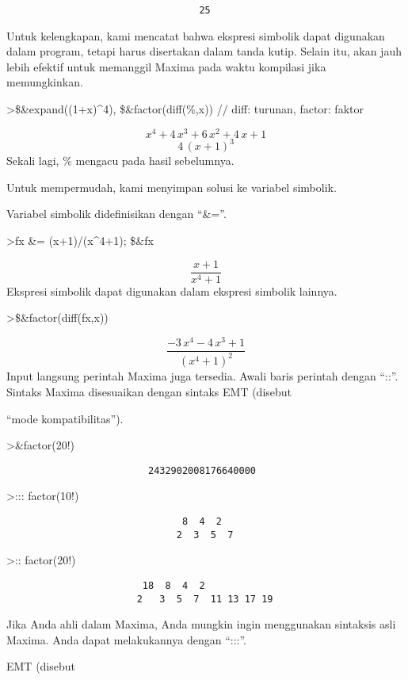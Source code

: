 \documentclass[
]{book}
\begin{document}
\begin{verbatim}
                                  25
\end{verbatim}

Untuk kelengkapan, kami mencatat bahwa ekspresi simbolik dapat digunakan dalam program, tetapi harus disertakan dalam tanda kutip. Selain itu, akan jauh lebih efektif untuk memanggil Maxima pada waktu kompilasi jika memungkinkan.

\textgreater\$\&expand((1+x)\^{}4), \$\&factor(diff(\%,x)) // diff: turunan, factor: faktor

\[x^4+4\,x^3+6\,x^2+4\,x+1\] \[4\,\left(x+1\right)^3\]Sekali lagi, \% mengacu pada hasil sebelumnya.

Untuk mempermudah, kami menyimpan solusi ke variabel simbolik.

Variabel simbolik didefinisikan dengan ``\&=''.

\textgreater fx \&= (x+1)/(x\^{}4+1); \$\&fx

\[\frac{x+1}{x^4+1}\]Ekspresi simbolik dapat digunakan dalam ekspresi simbolik lainnya.

\textgreater\$\&factor(diff(fx,x))

\[\frac{-3\,x^4-4\,x^3+1}{\left(x^4+1\right)^2}\]Input langsung perintah Maxima juga tersedia. Awali baris perintah dengan ``::''. Sintaks Maxima disesuaikan dengan sintaks EMT (disebut

``mode kompatibilitas'').

\textgreater\&factor(20!)

\begin{verbatim}
                         2432902008176640000
\end{verbatim}

\textgreater::: factor(10!)

\begin{verbatim}
                               8  4  2
                              2  3  5  7
\end{verbatim}

\textgreater:: factor(20!)

\begin{verbatim}
                        18  8  4  2
                       2   3  5  7  11 13 17 19
\end{verbatim}

Jika Anda ahli dalam Maxima, Anda mungkin ingin menggunakan sintaksis asli Maxima. Anda dapat melakukannya dengan ``:::''.

EMT (disebut
\end{document}
